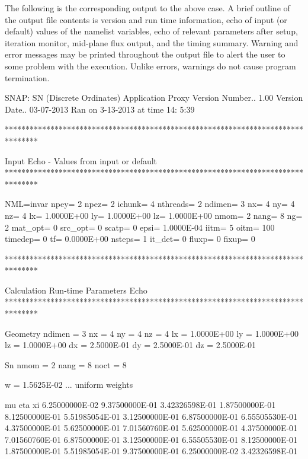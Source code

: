 The following is the corresponding output to the above case. A brief outline of the output file contents is version and run time information, echo of input (or default) values of the namelist variables, echo of relevant parameters after setup, iteration monitor, mid-\/plane flux output, and the timing summary. Warning and error messages may be printed throughout the output file to alert the user to some problem with the execution. Unlike errors, warnings do not cause program termination. \begin{DoxyVerb} SNAP: SN (Discrete Ordinates) Application Proxy
 Version Number..  1.00 
 Version Date..  03-07-2013
 Ran on  3-13-2013 at time 14: 5:39

********************************************************************************

          Input Echo - Values from input or default
********************************************************************************

  NML=invar
     npey=     2
     npez=     2
     ichunk=     4
     nthreads=     2
     ndimen=  3
     nx=     4
     ny=     4
     nz=     4
     lx=  1.0000E+00
     ly=  1.0000E+00
     lz=  1.0000E+00
     nmom=   2
     nang=    8
     ng=    2
     mat_opt=  0
     src_opt=  0
     scatp=  0
     epsi=  1.0000E-04
     iitm=   5
     oitm=  100
     timedep=  0
     tf=  0.0000E+00
     nsteps=     1
     it_det=  0
     fluxp=  0
     fixup=  0

********************************************************************************

          Calculation Run-time Parameters Echo
********************************************************************************

  Geometry
    ndimen = 3
    nx =     4
    ny =     4
    nz =     4
    lx =  1.0000E+00
    ly =  1.0000E+00
    lz =  1.0000E+00
    dx =  2.5000E-01
    dy =  2.5000E-01
    dz =  2.5000E-01

  Sn
    nmom = 2
    nang =    8
    noct = 8

    w =  1.5625E-02   ... uniform weights

          mu              eta               xi
     6.25000000E-02   9.37500000E-01   3.42326598E-01
     1.87500000E-01   8.12500000E-01   5.51985054E-01
     3.12500000E-01   6.87500000E-01   6.55505530E-01
     4.37500000E-01   5.62500000E-01   7.01560760E-01
     5.62500000E-01   4.37500000E-01   7.01560760E-01
     6.87500000E-01   3.12500000E-01   6.55505530E-01
     8.12500000E-01   1.87500000E-01   5.51985054E-01
     9.37500000E-01   6.25000000E-02   3.42326598E-01


\end{DoxyVerb}
